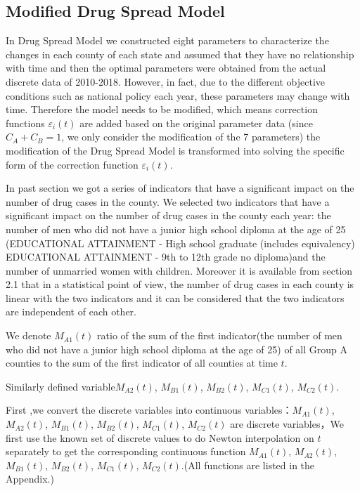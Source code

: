 \documentclass{mcmthesis}
\begin{document}
\subsection{Modified Drug Spread Model}
In Drug Spread Model we constructed eight parameters to characterize the changes in each county of each state and assumed that they have no relationship with time and then the optimal parameters were obtained from the actual discrete data of 2010-2018.  However, in fact, due to the different objective conditions such as national policy each year, these parameters may change with time. Therefore the model needs to be modified, which means correction functions ${\varepsilon _i}(t)$ are added based on the original parameter data (since ${C_A} + {C_B} = 1$, we only consider the modification of the 7 parameters) the modification of the Drug Spread Model is transformed into solving the specific form of the correction function ${\varepsilon _i}(t)$.

In past section we got a series of indicators that have a significant impact on the number of drug cases in the county. We selected two indicators that have a significant impact on the number of drug cases in the county each year: the number of men who did not have a junior high school diploma at the age of 25 (EDUCATIONAL ATTAINMENT - High school graduate (includes equivalency) EDUCATIONAL ATTAINMENT - 9th to 12th grade no diploma)and the number of unmarried women with children.  Moreover it is available from section 2.1 that in a statistical point of view, the number of drug cases in each county is linear with the two indicators and it can be considered that the two indicators are independent of each other.

We denote ${M_{A1}}(t)$ ratio of the sum of the first indicator(the number of men who did not have a junior high school diploma at the age of 25) of all Group A counties to the sum of the first indicator of all counties at time $t$.

Similarly defined variable${M_{A2}}(t)$, ${M_{B1}}(t)$, ${M_{B2}}(t)$, ${M_{C1}}(t)$, ${M_{C2}}(t)$.

First ,we convert the discrete variables into continuous variables：${M_{A1}}(t)$, ${M_{A2}}(t)$, ${M_{B1}}(t)$, ${M_{B2}}(t)$, ${M_{C1}}(t)$, ${M_{C2}}(t)$ are discrete variables，We first use the known set of discrete values to do Newton interpolation on $t$ separately to get the corresponding continuous function ${M_{A1}}(t)$, ${M_{A2}}(t)$, ${M_{B1}}(t)$, ${M_{B2}}(t)$, ${M_{C1}}(t)$, ${M_{C2}}(t)$.(All functions are listed in the Appendix.)
\end{document}
